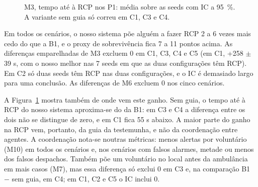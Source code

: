 \documentclass[11pt,a4paper]{article}
\begin{document}
\begin{figure}[htbp]
\centering
{}
\caption{M3, tempo até à RCP nos P1: média sobre as seeds com IC a 95~\%. A variante sem guia só correu em C1, C3 e C4.}\label{fig:m3}
\end{figure}

Em todos os cenários, o nosso sistema põe alguém a fazer RCP 2 a 6 vezes mais cedo do que a B1, e o proxy de sobrevivência fica 7 a 11 pontos acima. As diferenças emparelhadas de M3 excluem 0 em C1, C3, C4 e C5 (em C1, +258 $\pm$ 39 s, com o nosso melhor nas 7 seeds em que as duas configurações têm RCP). Em C2 só duas seeds têm RCP nas duas configurações, e o IC é demasiado largo para uma conclusão. As diferenças de M6 excluem 0 nos cinco cenários.

A Figura~\ref{fig:m3} mostra também de onde vem este ganho. Sem guia, o tempo até à RCP do nosso sistema aproxima-se do da B1: em C3 e C4 a diferença entre os dois não se distingue de zero, e em C1 fica 55 s abaixo. A maior parte do ganho na RCP vem, portanto, da guia da testemunha, e não da coordenação entre agentes. A coordenação nota-se noutras métricas: menos alertas por voluntário (M10) em todos os cenários e, nos cenários com falsos alarmes, metade ou menos dos falsos despachos. Também põe um voluntário no local antes da ambulância em mais casos (M7), mas essa diferença só exclui 0 em C3 e, na comparação B1 $-$ sem guia, em C4; em C1, C2 e C5 o IC inclui 0.
\end{document}
